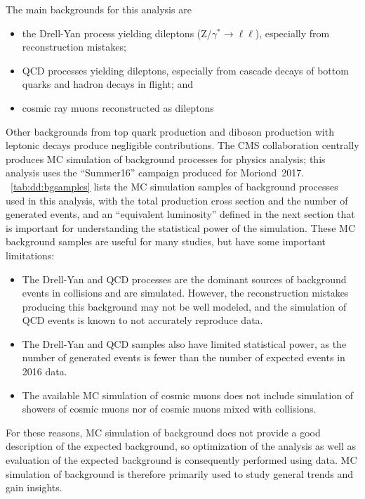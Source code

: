 The main backgrounds for this analysis are
\begin{itemize}
  \item the Drell-Yan process yielding dileptons (Z/$\gamma^* \to \ell\ell$), especially from reconstruction mistakes;
  \item QCD processes yielding dileptons, especially from cascade decays of bottom quarks and hadron decays in flight; and
  \item cosmic ray muons reconstructed as dileptons
\end{itemize}
Other backgrounds from top quark production and diboson production with leptonic decays produce negligible contributions.
The CMS collaboration centrally produces MC simulation of background processes for physics analysis; this analysis uses the ``Summer16'' campaign produced for Moriond~2017.
\Tab~\ref{tab:dd:bgsamples} lists the MC simulation samples of background processes used in this analysis, with the total production cross section and the number of generated events, and an ``equivalent luminosity'' defined in the next section that is important for understanding the statistical power of the simulation.
These MC background samples are useful for many studies, but have some important limitations:
\begin{itemize}
  \item The Drell-Yan and QCD processes are the dominant sources of background events in \pp collisions and are simulated. However, the reconstruction mistakes producing this background may not be well modeled, and the simulation of QCD events is known to not accurately reproduce data.
  \item The Drell-Yan and QCD samples also have limited statistical power, as the number of generated events is fewer than the number of expected events in 2016 data.
  \item The available MC simulation of cosmic muons does not include simulation of showers of cosmic muons nor of cosmic muons mixed with \pp collisions.
\end{itemize}
For these reasons, MC simulation of background does not provide a good description of the expected background, so optimization of the analysis as well as evaluation of the expected background is consequently performed using data.
MC simulation of background is therefore primarily used to study general trends and gain insights.

